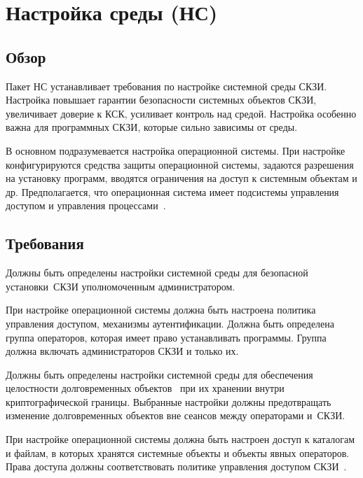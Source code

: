 \section{Настройка среды (НС)}\label{ES}

\subsection{Обзор}\label{ES.Defs}

Пакет НС устанавливает требования по настройке системной среды СКЗИ.
Настройка повышает гарантии безопасности системных объектов СКЗИ,
увеличивает доверие к КСК, усиливает контроль над средой.
%
Настройка особенно важна для программных СКЗИ, которые сильно зависимы от 
среды.

В основном подразумевается настройка операционной системы.
%
При настройке конфигурируются средства защиты операционной системы, 
задаются разрешения на установку программ, 
вводятся ограничения на доступ к системным объектам и др.
%
Предполагается, что операционная система имеет подсистемы управления 
доступом и управления 
процессами~.

\subsection{Требования}\label{ES.Reqs}

\label{R.ES.Install}
Должны быть определены настройки системной среды
для безопасной установки~СКЗИ уполномоченным администратором.

\begin{note}
При настройке операционной системы должна быть настроена политика
управления доступом, механизмы аутентификации. Должна быть определена группа
операторов, которая имеет право устанавливать программы. Группа должна включать
администраторов СКЗИ и только их.
\end{note}

\label{R.ES.Objects}
Должны быть определены настройки системной среды
для обеспечения целостности долговременных объектов~ 
при их хранении внутри криптографической границы. 
%
Выбранные настройки должны предотвращать 
изменение долговременных объектов вне сеансов между операторами и~СКЗИ.

\begin{note}
При настройке операционной системы должна быть настроен
доступ к каталогам и файлам, в которых хранятся системные объекты
и объекты явных операторов. Права доступа должны соответствовать 
политике управления доступом СКЗИ~.
\end{note}

